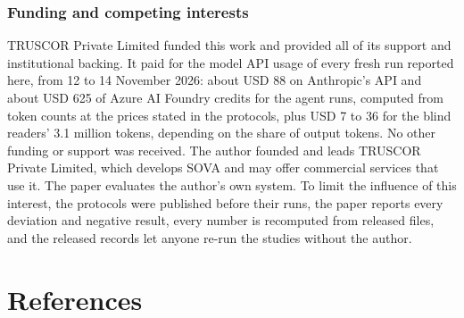 \documentclass[
  american,
  10pt,
  a4paper,
]{article}
\begin{document}
\subsubsection{Funding and competing
interests}\label{funding-and-competing-interests}

TRUSCOR Private Limited funded this work and provided all of its support
and institutional backing. It paid for the model API usage of every
fresh run reported here, from 12 to 14 November 2026: about USD 88 on
Anthropic's API and about USD 625 of Azure AI Foundry credits for the
agent runs, computed from token counts at the prices stated in the
protocols, plus USD 7 to 36 for the blind readers' 3.1 million tokens,
depending on the share of output tokens. No other funding or support was
received. The author founded and leads TRUSCOR Private Limited, which
develops SOVA and may offer commercial services that use it. The paper
evaluates the author's own system. To limit the influence of this
interest, the protocols were published before their runs, the paper
reports every deviation and negative result, every number is recomputed
from released files, and the released records let anyone re-run the
studies without the author.

\section*{References}\label{bibliography}
\end{document}
